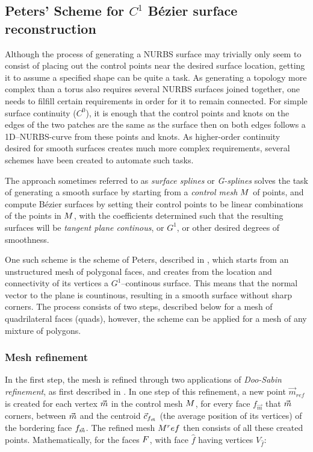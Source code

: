 \subsection{Peters' Scheme for $C^1$ B{\'e}zier surface reconstruction}
Although the process of generating a NURBS surface may trivially only seem to consist of placing out the control points near the desired surface location, getting it to assume a specified shape can be quite a task. As generating a topology more complex than a torus  also requires several NURBS surfaces joined together, one needs to filfill certain requirements in order for it to remain connected. For simple surface continuity ($C^0$), it is enough that the control points and knots on the edges of the two patches are the same as the surface then on both edges follows a 1D--NURBS-curve from these points and knots. As higher-order continuity desired for smooth surfaces creates much more complex requirements, several schemes have been created to automate such tasks.

The approach sometimes referred to as \emph{surface splines} or \emph{G-splines} \cite{eck1996automatic} solves the task of generating a smooth surface by starting from a \emph{control mesh} $\petersControlMesh$ of points, and compute B{\'e}zier surfaces by setting their control points to be linear combinations of the points in $\petersControlMesh$, with the coefficients determined such that the resulting surfaces will be \emph{tangent plane continous}, or $G^1$, or other desired degrees of smoothness. 

One such scheme is the scheme of Peters, described in \cite{peters1992constructing}, which starts from an unstructured mesh of polygonal faces, and creates from the location and connectivity of its vertices a $G^1$--continous surface. This means that the normal vector to the plane is countinous, resulting in a smooth surface without sharp corners. The process consists of two steps, described below for a mesh of quadrilateral faces (quads), however, the scheme can be applied for a mesh of any mixture of polygons.

\subsubsection{Mesh refinement}
In the first step, the mesh is refined through two applications of \emph{Doo-Sabin refinement}, as first described in \cite{DooSabin1978subdiv}. In one step of this refinement, a new point $\vec{m}_{ref}$  is created for each vertex $\petersControlMeshVec$ in the control mesh $\petersControlMesh$, for every face $f_{\vec{m}}$ that $\petersControlMeshVec$ corners,  between $\petersControlMeshVec$ and the centroid $\centroidof{f_{\petersControlMeshVec}}$ (the average position of its vertices) of the bordering face $f_{\petersControlMeshVec}$. The refined mesh $\petersControlMesh^ref$ then consists of all these created points. Mathematically, for the faces $\petersFaces$, with face ${\hat{f}}$ having vertices $V_{\hat{f}}$:

